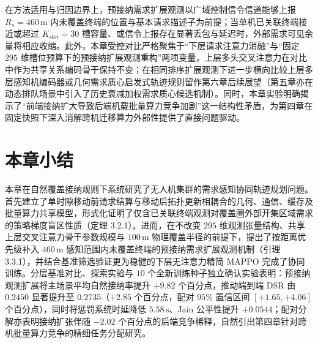 在方法适用与归因边界上，预接纳需求扩展观测以广域控制信令信道能够上报 $R_s=460\,\mathrm{m}$ 内未覆盖终端的位置与基本请求描述子为前提；当单机已关联终端接近或超过 $K_{\mathrm{slot}}=30$ 槽容量、或信令上报存在显著丢包与延迟时，外部需求可见余量将相应收缩。此外，本章受控对比严格聚焦于“下层请求注意力消融”与“固定 $295$ 维槽位预算下的预接纳扩展观测重构”两项变量，上层多头交叉注意力在对比中作为共享关系编码骨干保持不变；在相同排序扩展观测下进一步横向比较上层多层感知机编码器或几何需求质心启发式轨迹规则留作第六章后续展望（第五章亦在动态排队场景中引入了历史衰减加权需求质心候选机制）。同时，本章实验明确揭示了“前端接纳扩大导致后端机载批量算力竞争加剧”这一结构性矛盾，为第四章在固定快照下深入消解跨机迁移算力外部性提供了直接问题驱动。

\section{本章小结}
\label{sec:ch3-summary}

本章在自然覆盖接纳规则下系统研究了无人机集群的需求感知协同轨迹规划问题。首先建立了单时隙移动前请求结算与移动后拓扑更新相耦合的几何、通信、缓存及批量算力共享模型，形式化证明了仅含已关联终端观测对覆盖圈外部开集区域需求的策略梯度盲区性质（定理 3.2.1）。进而，在不改变 $295$ 维观测张量结构、共享上层交叉注意力骨干参数规模与 $100\,\mathrm{m}$ 物理覆盖半径的前提下，提出了按距离优先级补入 $460\,\mathrm{m}$ 感知范围内未覆盖终端的预接纳需求扩展观测机制（引理 3.3.1），并结合基准筛选验证更为稳健的下层无注意力精简 MAPPO 完成了协同训练。分层基准对比、探索实验与 $10$ 个全新训练种子独立确认实验表明：预接纳观测扩展将主场景平均自然接纳率提升 $+9.82$ 个百分点，推动端到端 DSR 由 $0.2450$ 显著提升至 $0.2735$（$+2.85$ 个百分点，配对 $95\%$ 置信区间 $[+1.65,+4.06]$ 个百分点），同时将惩罚系统时延降低 $5.58\,\mathrm{s}$、Jain 公平性提升 $+0.0544$；配对分解亦表明接纳扩张伴随 $-2.02$ 个百分点的后端竞争稀释，自然引出第四章针对跨机批量算力竞争的精细任务分配研究。
